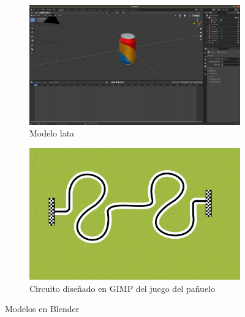 \begin{figure}[H]
  \begin{subfigure}[b]{0.5\textwidth}
  \centering
    \includegraphics[width=1\textwidth, height=0.6\textwidth]{chapters/images/lata.png}
    \caption{Modelo lata}
    \label{fig:f1}
  \end{subfigure}
  \hfill
  \begin{subfigure}[b]{0.5\textwidth}
  \centering
     \includegraphics[width=1\textwidth, height=0.6\textwidth]{chapters/images/handkerchief.png}
     \caption{Circuito diseñado en GIMP del juego del pañuelo} 
    \label{fig:f2}
 
  \end{subfigure}
  \caption{Modelos en Blender}
\end{figure}
 

